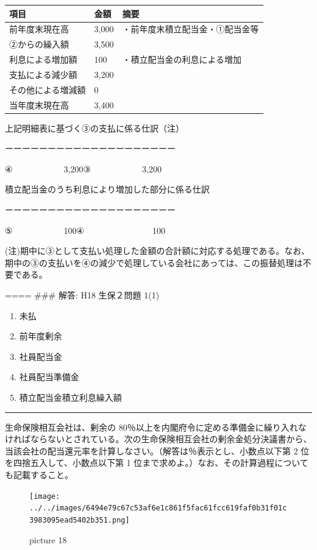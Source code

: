 \documentclass[report,gutter=10mm,fore-edge=10mm,uplatex,dvipdfmx]{jlreq}
\begin{document}
\begin{longtable}[]{@{}lll@{}}
\toprule
項目 & 金額 & 摘要\tabularnewline
\midrule
\endhead
前年度末現在高 & 3,000 & ・前年度末積立配当金・①配当金等\tabularnewline
②からの繰入額 & 3,500 &\tabularnewline
利息による増加額 & 100 & ・積立配当金の利息による増加\tabularnewline
支払による減少額 & 3,200 &\tabularnewline
その他による増減額 & 0 &\tabularnewline
当年度末現在高 & 3,400 &\tabularnewline
\bottomrule
\end{longtable}

上記明細表に基づく③の支払に係る仕訳（注）

ーーーーーーーーーーーーーーーーーーーー

④　　　　　　3,200\textbar③　　　　　　3,200

積立配当金のうち利息により増加した部分に係る仕訳

ーーーーーーーーーーーーーーーーーーーー

⑤　　　　　　100\textbar④　　　　　　　　100

(注)期中に③として支払い処理した金額の合計額に対応する処理である。なお、期中の③の支払いを④の減少で処理している会社にあっては、この振替処理は不要である。

==== \#\#\# 解答: H18 生保２問題 1(1)

\begin{enumerate}
\tightlist
\item
  未払
\item
  前年度剰余
\item
  社員配当金
\item
  社員配当準備金
\item
  積立配当金積立利息繰入額
\end{enumerate}

\begin{center}\rule{0.5\linewidth}{0.5pt}\end{center}


生命保険相互会社は、剰余の
80％以上を内閣府令に定める準備金に繰り入れなければならないとされている。次の生命保険相互会社の剰余金処分決議書から、当該会社の配当還元率を計算しなさい。（解答は％表示とし、小数点以下第
2 位を四捨五入して、小数点以下第 1
位まで求めよ。）なお、その計算過程についても記載すること。

\begin{figure}
\centering
\texttt{[image: ../../images/6494e79c67c53af6e1c861f5fac61fcc619faf0b31f01c3983095ead5402b351.png]}
\caption{picture 18}
\end{figure}
\end{document}
